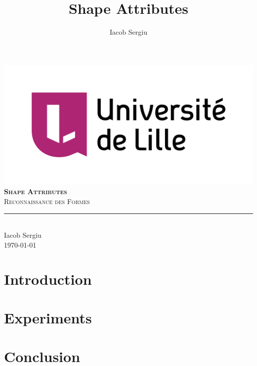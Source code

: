 \documentclass[11pt,titlepage]{report}
\author{Iacob Sergiu}
\title{Shape Attributes}
\begin{document}
\begin{titlepage}
	\centering
    \includegraphics[width=0.75\linewidth]{images/universite_de_lille.png}\\[0.25cm] 	%
    \vspace{\fill}
    \textbf{\textsc{\fontsize{50}{50}\selectfont Shape Attributes}}\\ \vspace{\fill}		
	\textsc{\LARGE Reconnaissance des Formes}\\[0.4cm]
	\rule{\linewidth}{0.2 mm} \\[0.5 cm]
	Iacob Sergiu \\[2cm]
	\today
\end{titlepage}
\restoregeometry







\tableofcontents

\chapter{Introduction}


\chapter{Experiments}


\chapter{Conclusion}


\clearpage
\pagestyle{numberonly}

\printbibliography
\end{document}
